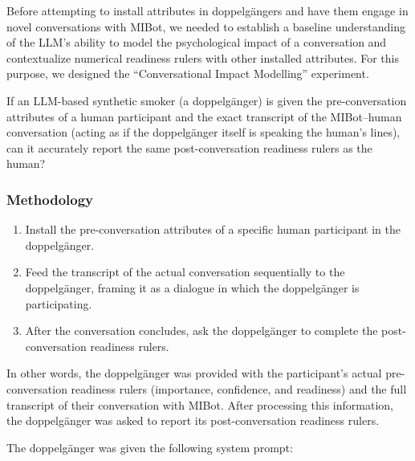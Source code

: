 Before attempting to install attributes in doppelgängers and have them engage in novel conversations with MIBot, we needed to establish a baseline understanding of the LLM's ability to model the psychological impact of a conversation and contextualize numerical readiness rulers with other installed attributes. For this purpose, we designed the ``Conversational Impact Modelling'' experiment.

If an LLM-based synthetic smoker (a doppelgänger) is given the pre-conversation attributes of a human participant and the exact transcript of the MIBot--human conversation (acting as if the doppelgänger itself is speaking the human's lines), can it accurately report the same post-conversation readiness rulers as the human?

\subsubsection{Methodology}
\begin{enumerate}
    \item Install the pre-conversation attributes of a specific human participant in the doppelgänger.
    \item Feed the transcript of the actual conversation sequentially to the doppelgänger, framing it as a dialogue in which the doppelgänger is participating.
    \item After the conversation concludes, ask the doppelgänger to complete the post-conversation readiness rulers.
\end{enumerate}

In other words, the doppelgänger was provided with the participant's actual pre-conversation readiness rulers (importance, confidence, and readiness) and the full transcript of their conversation with MIBot. After processing this information, the doppelgänger was asked to report its post-conversation readiness rulers.

The doppelgänger was given the following system prompt:


